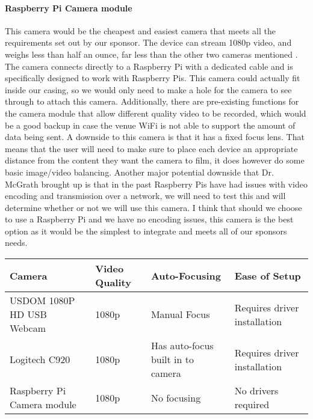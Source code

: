 \documentclass[onecolumn, draftclsnofoot,10pt, compsoc]{IEEEtran}
\begin{document}
            \paragraph{Raspberry Pi Camera module}
            This camera would be the cheapest and easiest camera that meets all the requirements set out by our sponsor. The device can stream 1080p video, and weighs less than half an ounce, far less than the other two cameras mentioned \cite{IEEEhowto:RaspberryPiModule}. The camera connects directly to a Raspberry Pi with a dedicated cable and is specifically designed to work with Raspberry Pis. This camera could actually fit inside our casing, so we would only need to make a hole for the camera to see through to attach this camera. Additionally, there are pre-existing functions for the camera module that allow different quality video to be recorded, which would be a good backup in case the venue WiFi is not able to support the amount of data being sent. A downside to this camera is that it has a fixed focus lens. That means that the user will need to make sure to place each device an appropriate distance from the content they want the camera to film, it does however do some basic image/video balancing. Another major potential downside that Dr. McGrath brought up is that in the past Raspberry Pis have had issues with video encoding and transmission over a network, we will need to test this and will determine whether or not we will use this camera. I think that should we choose to use a Raspberry Pi and we have no encoding issues, this camera is the best option as it would be the simplest to integrate and meets all of our sponsors needs.
            \newline
            \newline
            \begin{tabular}{|l|p{3cm}|p{4cm}|p{4cm}|}
                 \hline
                 Camera & Video Quality & Auto-Focusing & Ease of Setup \\ \hline
                 
                 USDOM 1080P HD USB Webcam & 1080p & Manual Focus  & Requires driver installation \\ \hline
                 
                 Logitech C920 & 1080p & Has auto-focus built in to camera & Requires driver installation \\ \hline
                 
                 Raspberry Pi Camera module & 1080p & No focusing & No drivers required \\ \hline
            \end{tabular}
        
\end{document}
